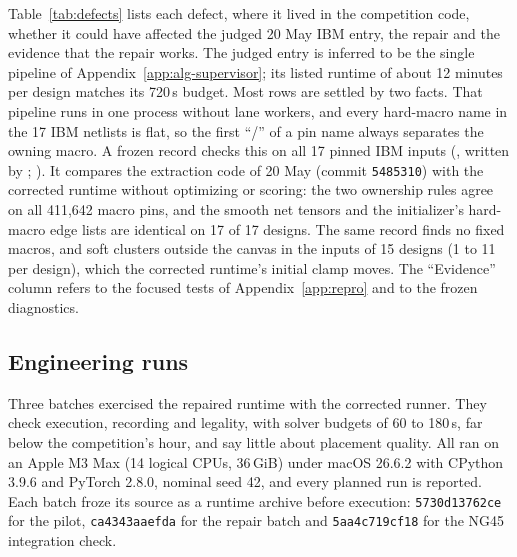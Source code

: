 Table~\ref{tab:defects} lists each defect, where it lived in the competition code,
whether it could have affected the judged 20 May IBM entry, the repair and the
evidence that the repair works. The judged entry is inferred to be the single
pipeline of Appendix~\ref{app:alg-supervisor}; its listed runtime of about 12 minutes
per design matches its 720\,s budget. Most rows are settled by two facts. That pipeline runs
in one process without lane workers, and every hard-macro name in the 17 IBM netlists
is flat, so the first ``/'' of a pin name always separates the owning macro. A
frozen record checks this on all 17 pinned IBM inputs
(, written by
; \measurement). It
compares the extraction code of 20 May (commit \texttt{5485310}) with the corrected
runtime without optimizing or scoring: the two ownership rules agree on all 411,642
macro pins, and the smooth net tensors and the initializer's hard-macro edge lists
are identical on 17 of 17 designs. The same record finds no fixed macros, and soft
clusters outside the canvas in the inputs of 15 designs (1 to 11 per design), which
the corrected runtime's initial clamp moves. The ``Evidence'' column refers to the
focused tests of Appendix~\ref{app:repro} and to the frozen diagnostics.




\subsection{Engineering runs}\label{app:engineering}

Three batches exercised the repaired runtime with the corrected runner. They check
execution, recording and legality, with solver budgets of 60 to 180\,s, far below the
competition's hour, and say little about placement quality. All ran on
an Apple M3 Max (14 logical CPUs, 36\,GiB) under macOS 26.6.2 with CPython 3.9.6 and
PyTorch 2.8.0, nominal seed 42, and every planned run is reported. Each batch froze its
source as a runtime archive before execution: \texttt{5730d13762ce} for the pilot,
\texttt{ca4343aaefda} for the repair batch and \texttt{5aa4c719cf18} for the NG45
integration check.

